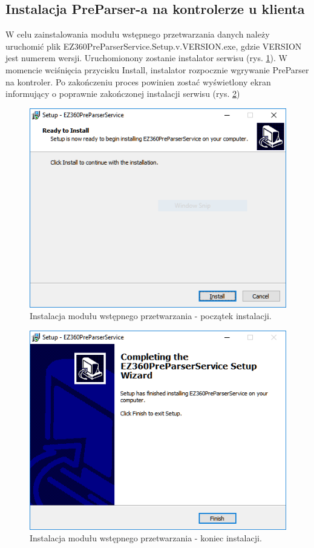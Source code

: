 \documentclass[a4paper]{book}
\begin{document}
\subsection{Instalacja PreParser-a na kontrolerze u klienta}
W celu zainstalowania  modułu wstępnego przetwarzania danych należy uruchomić plik EZ360PreParserService.Setup.v.VERSION.exe, gdzie VERSION jest numerem wersji.
Uruchomionony zostanie instalator serwisu (rys. \ref{fig:preparser_installation_part1}). W momencie wciśnięcia przycisku Install, instalator rozpocznie wgrywanie PreParser na kontroler. Po zakończeniu proces powinien zostać wyświetlony ekran informujący o poprawnie zakończonej instalacji serwisu (rys. \ref{fig:preparser_installation_part2})
\begin{figure}[h]
	\centering
	\includegraphics[width=\textwidth]{./img/preparser_installation_part1.png}
	\caption{Instalacja modułu wstępnego przetwarzania - początek instalacji.}
	\label{fig:preparser_installation_part1}
\end{figure}
\begin{figure}[h]
	\centering
	\includegraphics[width=\textwidth]{./img/preparser_installation_part2.png}
	\caption{Instalacja modułu wstępnego przetwarzania - koniec instalacji.}
	\label{fig:preparser_installation_part2}
\end{figure}
\end{document}
